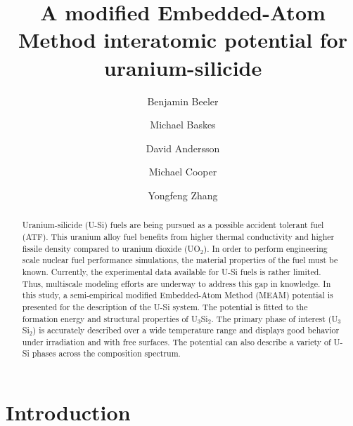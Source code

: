 \documentclass[review]{elsarticle}
\begin{document}
\begin{frontmatter}
\title{A modified Embedded-Atom Method interatomic potential for uranium-silicide}

\author[inl]{Benjamin Beeler}
\author[lanl,ucsd,msu]{Michael Baskes}
\author[lanl]{David Andersson}
\author[lanl]{Michael Cooper}
\author[inl]{Yongfeng Zhang}
\address[inl]{Idaho National Laboratory, Idaho Falls, ID 83415}
\address[lanl]{Los Alamos National Laboratory, Los Alamos, NM 87545}
\address[ucsd]{University of California-San Diego, San Diego, CA 92093}
\address[msu]{Mississippi State University, MS 39762}


\begin{abstract}

Uranium-silicide (U-Si) fuels are being pursued as a possible accident tolerant fuel (ATF).  This uranium alloy fuel benefits from higher thermal conductivity and higher fissile density compared to uranium dioxide (UO$_{2}$).  In order to perform engineering scale nuclear fuel performance simulations, the material properties of the fuel must be known.  Currently, the experimental data available for U-Si fuels is rather limited.  Thus, multiscale modeling efforts are underway to address this gap in knowledge.  In this study, a semi-empirical modified Embedded-Atom Method (MEAM) potential is presented for the description of the U-Si system.  The potential is fitted to the formation energy and structural properties of U$_{3}$Si$_{2}$. The primary phase of interest (U$_{3}$Si$_{2}$) is accurately described over a wide temperature range and displays good behavior under irradiation and with free surfaces.  The potential can also describe a variety of U-Si phases across the composition spectrum.  

\end{abstract}
\end{frontmatter}

\section{Introduction}
\end{document}
